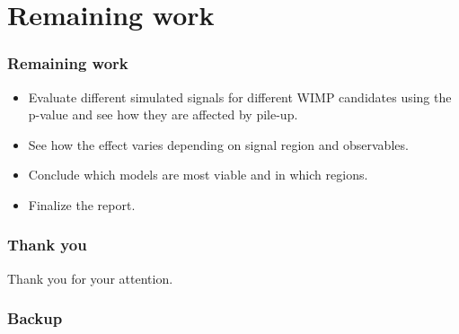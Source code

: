 \documentclass[•]{beamer}
\theoremstyle{remark}
\begin{document}
\section{Remaining work}
\begin{frame}\frametitle{Remaining work}
\begin{block}

\begin{itemize}
\item Evaluate different simulated signals for different WIMP candidates using the p-value and see how they are affected by pile-up.
\item See how the effect varies depending on signal region and observables.
\item Conclude which models are most viable and in which regions.
\item Finalize the report.
\end{itemize}
\end{block}
\end{frame}

\begin{frame}\frametitle{Thank you}
\begin{block}

Thank you for your attention.
\end{block}
\end{frame}

\begin{frame}[noframenumbering]\frametitle{Backup}
\end{frame}
\end{document}
